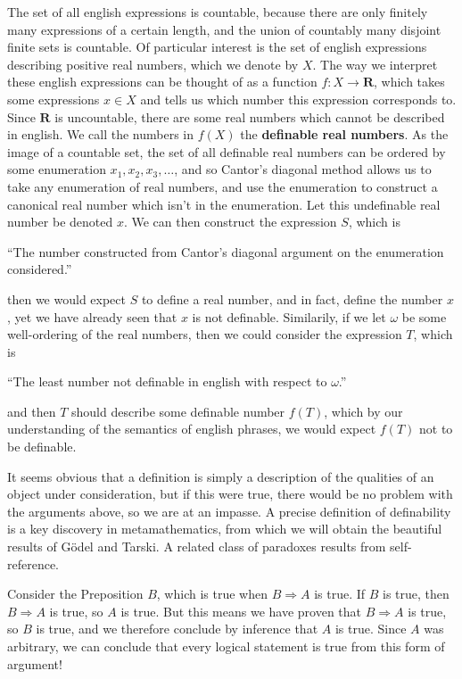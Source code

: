 \begin{example}
    The set of all english expressions is countable, because there are only finitely many expressions of a certain length, and the union of countably many disjoint finite sets is countable. Of particular interest is the set of english expressions describing positive real numbers, which we denote by $X$. The way we interpret these english expressions can be thought of as a function $f: X \to \mathbf{R}$, which takes some expressions $x \in X$ and tells us which number this expression corresponds to. Since $\mathbf{R}$ is uncountable, there are some real numbers which cannot be described in english. We call the numbers in $f(X)$ the {\bf definable real numbers}. As the image of a countable set, the set of all definable real numbers can be ordered by some enumeration $x_1, x_2, x_3, \dots$, and so Cantor's diagonal method allows us to take any enumeration of real numbers, and use the enumeration to construct a canonical real number which isn't in the enumeration. Let this undefinable real number be denoted $x$. We can then construct the expression $S$, which is
    \begin{center}
        ``The number constructed from Cantor's diagonal argument on the enumeration considered.''
    \end{center}
    then we would expect $S$ to define a real number, and in fact, define the number $x$, yet we have already seen that $x$ is not definable. Similarily, if we let $\omega$ be some well-ordering of the real numbers, then we could consider the expression $T$, which is
    \begin{center}
        ``The least number not definable in english with respect to $\omega$.''
    \end{center}
    and then $T$ should describe some definable number $f(T)$, which by our understanding of the semantics of english phrases, we would expect $f(T)$ not to be definable.
\end{example}

It seems obvious that a definition is simply a description of the qualities of an object under consideration, but if this were true, there would be no problem with the arguments above, so we are at an impasse. A precise definition of definability is a key discovery in metamathematics, from which we will obtain the beautiful results of G\"{o}del and Tarski. A related class of paradoxes results from self-reference.

\begin{example}[L\"{o}b]
    Consider the Preposition $B$, which is true when $B \Rightarrow A$ is true. If $B$ is true, then $B \Rightarrow A$ is true, so $A$ is true. But this means we have proven that $B \Rightarrow A$ is true, so $B$ is true, and we therefore conclude by inference that $A$ is true. Since $A$ was arbitrary, we can conclude that every logical statement is true from this form of argument!
\end{example}

